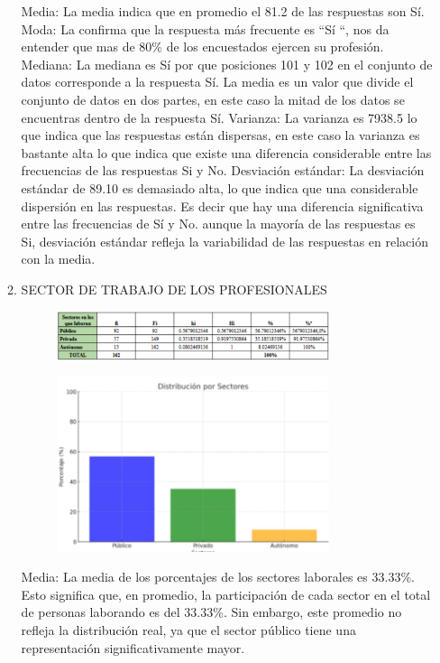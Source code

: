 \documentclass[12pt, a4paper]{article}
\begin{document}
\begin{enumerate}
\begin{enumerate}
        Media: La media indica que en promedio el 81.2 de las respuestas son Sí.
Moda: La confirma que la respuesta más frecuente es “Sí “, nos da entender que mas de 80\% de los encuestados ejercen su profesión.
 Mediana: La mediana es Sí por que posiciones 101 y 102 en el conjunto de datos corresponde a la respuesta Sí. La media es un valor que divide el conjunto de datos en dos partes, en este caso la mitad de los datos se encuentras dentro de la respuesta Sí.
Varianza: La varianza es 7938.5 lo que indica que las respuestas están dispersas, en este caso la varianza es bastante alta lo que indica que existe una diferencia considerable entre las frecuencias de las respuestas Si y No.
 Desviación estándar: La desviación estándar de 89.10 es demasiado alta, lo que indica que una considerable dispersión en las respuestas. Es decir que hay una diferencia significativa entre las frecuencias de Sí y No. aunque la mayoría de las respuestas es Si, desviación estándar refleja la variabilidad de las respuestas en relación con la media.
        \item SECTOR DE TRABAJO DE LOS PROFESIONALES
        \begin{figure}[H]
            \begin{center}
                \includegraphics[width=0.80\textwidth]{images/trabajoprofesiones.png}
            \end{center}
            \label{fig:trabajoprofesiones}
        \end{figure}
        \begin{figure}[H]
            \begin{center}
                \includegraphics[width=0.80\textwidth]{images/distribucionSectores.png}
            \end{center}
            \label{fig:distribucionSectores}
        \end{figure}
        Media:
La media de los porcentajes de los sectores laborales es 33.33\%. Esto significa que, en promedio, la participación de cada sector en el total de personas laborando es del 33.33\%. Sin embargo, este promedio no refleja la distribución real, ya que el sector público tiene una representación significativamente mayor.


\end{enumerate}
\end{enumerate}
\end{document}
